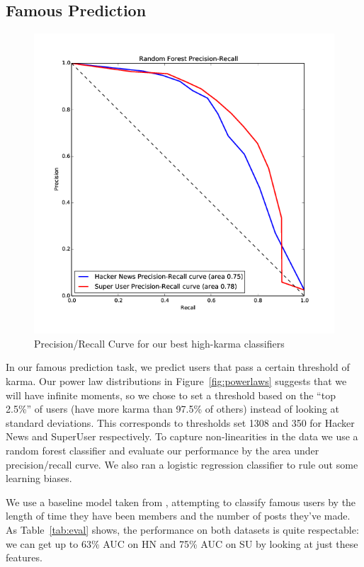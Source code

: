 \documentclass[11pt]{article}
\begin{document}
\subsection{Famous Prediction}
\label{sec:classification}

\begin{figure}[h]
\centering
\includegraphics[width=\linewidth]{classification_pr_curve-png}
\caption{Precision/Recall Curve for our best high-karma classifiers}
\label{fig:classification}
\end{figure}

In our famous prediction task, we predict users that
pass a certain threshold of karma. Our power law distributions in
Figure~\ref{fig:powerlaws} suggests that we will have infinite moments, so we
chose to set a threshold based on the ``top 2.5\%'' of users (have more karma
than 97.5\% of others) instead of looking at standard deviations. This
corresponds to thresholds set 1308 and 350 for Hacker News and SuperUser
respectively.  To capture non-linearities in the data we use a random forest
classifier and evaluate our performance by the area under precision/recall
curve. We also ran a logistic regression classifier to rule out some 
learning biases.

We use a baseline model taken from \citet{movshovitzanalysis}, attempting to
classify famous users by the length of time they have been members and the
number of posts they've made. As Table~\ref{tab:eval} shows, the performance on
both datasets is quite respectable: we can get up to 63\% AUC on HN and 75\% AUC
on SU by looking at just these features.
\end{document}
